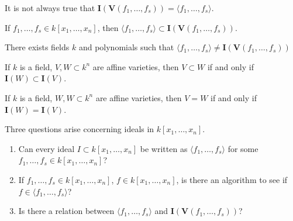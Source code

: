 \documentclass[crop=false,class=article,oneside]{standalone}
\begin{document}
    \begin{remark}
    It is not always true that $\mathbf{I}(\mathbf{V}(f_1,\hdots, f_s)) = \langle f_1,\hdots, f_s\rangle$.
    \end{remark}
    \begin{theorem}
    If $f_1,\hdots, f_s \in k[x_1,\hdots ,x_n]$, then $\langle f_1,\hdots, f_s \rangle \subset \mathbf{I}(\mathbf{V}(f_1,\hdots, f_s))$.
    \end{theorem}
    \begin{theorem}
    There exists fields $k$ and polynomials such that $\langle f_1,\hdots,f_s\rangle \ne \mathbf{I}(\mathbf{V}(f_1,\hdots, f_s))$
    \end{theorem}
    \begin{theorem}
    If $k$ is a field, $V,W\subset k^n$ are affine varieties, then $V\subset W$ if and only if $\mathbf{I}(W)\subset \mathbf{I}(V)$.
    \end{theorem}
    \begin{theorem}
    If $k$ is a field, $W,W\subset k^n$ are affine varieties, then $V=W$ if and only if $\mathbf{I}(W)=\mathbf{I}(V)$.
    \end{theorem}
    Three questions arise concerning ideals in $k[x_1,\hdots ,x_n]$.
    \begin{enumerate}
        \item Can every ideal $I\subset k[x_1,\hdots ,x_n]$ be written as $\langle f_1,\hdots, f_s\rangle$ for some $f_1,\hdots, f_s \in k[x_1,\hdots ,x_n]$?
        \item If $f_1,\hdots, f_s\in k[x_1,\hdots ,x_n]$, $f\in k[x_1,\hdots ,x_n]$, is there an algorithm to see if $f\in\langle f_{1},\hdots,f_{s}\rangle$?
        \item Is there a relation between $\langle f_1,\hdots, f_s\rangle$ and $\mathbf{I}(\mathbf{V}(f_1,\hdots, f_s))$?
    \end{enumerate}
\end{document}
